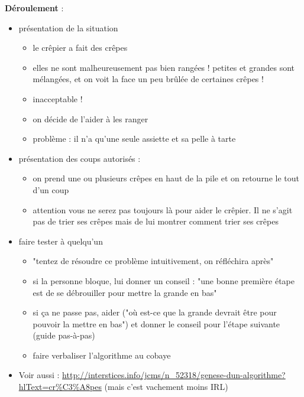 \documentclass[a4paper]{article}
\newcommand{\titre}[1]{\medskip\noindent\textbf{#1} : }
\newcommand{\deroulement}{\titre{Déroulement}}
\begin{document}
\deroulement
\begin{itemize}
\item présentation de la situation
\begin{itemize}
\item le crêpier a fait des crêpes
\item elles ne sont malheureusement pas bien rangées ! petites et grandes sont mélangées, et on voit la face un peu brûlée de certaines crêpes !
\item inacceptable !
\item on décide de l'aider à les ranger
\item problème : il n'a qu'une seule assiette et sa pelle à tarte
\end{itemize}
\item présentation des coups autorisés :
\begin{itemize}

\item on prend une ou plusieurs crêpes en haut de la pile et on retourne le
tout d'un coup

\item attention vous ne serez pas toujours là pour aider le crêpier. Il ne
s'agit pas de trier ses crêpes mais de lui montrer comment trier ses crêpes

\end{itemize}
\item faire tester à quelqu'un
\begin{itemize}

\item "tentez de résoudre ce problème intuitivement, on réfléchira après"

\item si la personne bloque, lui donner un conseil : "une bonne première étape
est de se débrouiller pour mettre la grande en bas"

\item si ça ne passe pas, aider ("où est-ce que la grande devrait être pour
pouvoir la mettre en bas") et donner le conseil pour l'étape suivante (guide
pas-à-pas)

\item faire verbaliser l'algorithme au cobaye

\end{itemize}

\item Voir aussi :
\url{http://interstices.info/jcms/n_52318/genese-dun-algorithme?hlText=cr%C3%A8pes}
(mais c'est vachement moins IRL)

\end{itemize}
\end{document}

